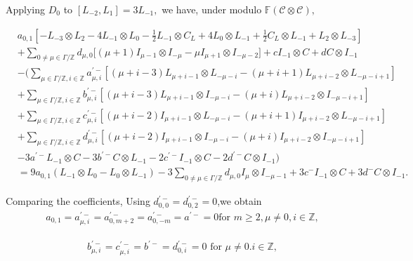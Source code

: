 \documentclass{amsart}
\theoremstyle{definition}
\theoremstyle{remark}
\numberwithin{equation}{subsection}
\numberwithin{equation}{section}
\begin{document}
Applying $D_0$ to $[L_{-2},L_1]=3L_{-1},$ we have, under modulo
$\mathbb{F}(\mathcal {C}\otimes \mathcal {C}),$

$$\begin{array}{llll}
 & a_{0,1}[-L_{-3}\otimes L_2-4L_{-1}\otimes L_0-
 \frac{1}{2}L_{-1}\otimes C_L+4L_0\otimes L_{-1}+\frac{1}{2} C_L \otimes L_{-1}+L_2\otimes
 L_{-3}]  \\&

 +\underset{0\neq\mu\in
\Gamma/\mathbb{Z}}{\sum}{d_{\mu,0}[(\mu+1)I_{\mu-1} \otimes
I_{-\mu}}-\mu I_{\mu+1}\otimes I_{-\mu-2}] +c I_{-1}\otimes C +d C
\otimes I_{-1}  \\&

-(\underset{\mu\in \Gamma/\mathbb{Z},i\in
\mathbb{Z}}{\sum}{a^{'-}_{\mu,i} [(\mu+i-3)L_{\mu+i-1} \otimes
L_{-\mu-i}-(\mu+i+1)L_{\mu+i-2}\otimes L_{-\mu-i+1}]}   \\&

+\underset{\mu\in \Gamma/\mathbb{Z},i\in
\mathbb{Z}}{\sum}{b^{'-}_{\mu,i} [(\mu+i-3)L_{\mu+i-1} \otimes
I_{-\mu-i}-(\mu+i)L_{\mu+i-2}\otimes I_{-\mu-i+1}]}    \\&

+\underset{\mu\in \Gamma/\mathbb{Z},i\in
\mathbb{Z}}{\sum}{c^{'-}_{\mu,i} [(\mu+i-2)I_{\mu+i-1} \otimes
L_{-\mu-i}-(\mu+i+1)I_{\mu+i-2}\otimes L_{-\mu-i+1}]}     \\&
+\underset{\mu\in \Gamma/\mathbb{Z},i\in
\mathbb{Z}}{\sum}{d^{'-}_{\mu,i} [(\mu+i-2)I_{\mu+i-1} \otimes
I_{-\mu-i}-(\mu+i)I_{\mu+i-2}\otimes I_{-\mu-i+1}]}     \\& -3a^{'-}
L_{-1}\otimes C-3b^{'-} C \otimes L_{-1} -2c^{'-} I_{-1}\otimes
C-2d^{'-} C \otimes I_{-1})
\\&

=9a_{0,1}(L_{-1}\otimes L_0-L_0\otimes L_{-1})-3
 \underset{0\neq\mu\in \Gamma/\mathbb{Z}}{\sum}{d_{\mu,0}I_\mu \otimes
I_{-\mu-1}}

+3c^{-} I_{-1}\otimes C +3d^{-} C \otimes I_{-1}.
\end{array}$$

Comparing the coefficients, Using $d^{'-}_{0,0}=d^{'-}_{0,2}=0$,we
obtain
$$\begin{array}{llll}
a_{0,1}=a^{'-}_{\mu,i}=a^{'-}_{0,m+2}=a^{'-}_{0,-m}=a^{'-}=0 \mbox{
\ for \ } m\geq 2,\mu\neq 0, i\in\mathbb{Z},
\end{array}$$

$$\begin{array}{llll}
b^{'-}_{\mu,i}=c^{'-}_{\mu,i}=b^{'-}=d^{'-}_{0,i}=0 \mbox{ \ for \ }
\mu\neq 0. i\in\mathbb{Z},
\end{array}$$
\end{document}
